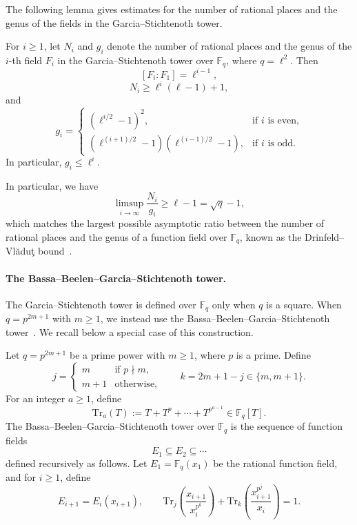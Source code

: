 \documentclass[11pt]{article}
\newcommand{\F}{\mathbb{F}}
\newcommand{\Tr}{\mathrm{Tr}}
\begin{document}
The following lemma gives estimates for the number of rational places and the genus of the fields in the Garcia--Stichtenoth tower.

\begin{lemma}[{\cite{GS96}}]\label{lem:GS}
For $i\geq 1$, let $N_i$ and $g_i$ denote the number of rational places and the genus of the $i$-th field $F_i$ in the Garcia--Stichtenoth tower over $\F_q$, where $q=\ell^2$. Then
\[
[F_i:F_1]=\ell^{i-1},
\]
\[
N_i\geq \ell^i(\ell-1)+1,
\]
and
\[
g_i =
\begin{cases}
(\ell^{i/2}-1)^2, & \text{if } i \text{ is even,}\\[4pt]
(\ell^{(i+1)/2}-1)(\ell^{(i-1)/2}-1), & \text{if } i \text{ is odd.}
\end{cases}
\]
In particular, $g_i\leq \ell^i$.
\end{lemma} %

In particular, we have
\[
\limsup_{i\to\infty}\frac{N_i}{g_i}\ge \ell-1=\sqrt{q}-1,
\]
which matches the largest possible asymptotic ratio between the number of rational places and the genus of a function field over $\F_q$, known as the Drinfeld--Vl\u{a}du\c{t} bound~\cite{VS83}.

\paragraph{The Bassa--Beelen--Garcia--Stichtenoth tower.}
The Garcia--Stichtenoth tower is defined over $\F_q$ only when $q$ is a square. When $q=p^{2m+1}$ with $m\ge 1$, we instead use the Bassa--Beelen--Garcia--Stichtenoth tower~\cite{BBGS15}. We recall below a special case of this construction.

\begin{definition}
Let $q=p^{2m+1}$ be a prime power with $m\geq 1$, where $p$ is a prime.
Define
\[
j=\begin{cases}
m & \text{if } p \nmid m,\\
m+1 & \text{otherwise,}
\end{cases}
\qquad
k=2m+1-j\in\{m,m+1\}.
\]
For an integer $a\geq 1$, define
\[
\Tr_a(T):=T+T^p+\cdots+T^{p^{a-1}}\in\F_q[T].
\]
The Bassa--Beelen--Garcia--Stichtenoth tower over $\F_q$ is the sequence of function fields
\[
E_1 \subseteq E_2 \subseteq \cdots
\]
defined recursively as follows.
Let $E_1=\F_q(x_1)$ be the rational function field, and for $i\ge 1$, define
\[
E_{i+1}=E_i(x_{i+1}),
\qquad
\Tr_j\!\left(\frac{x_{i+1}}{x_i^{p^k}}\right)
+
\Tr_k\!\left(\frac{x_{i+1}^{p^j}}{x_i}\right)
=1.
\]
\end{definition}
\end{document}
